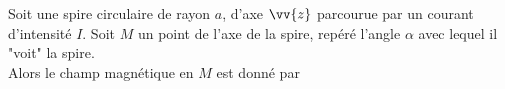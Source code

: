 ﻿\documentclass[a4paper]{article}
\begin{document}
\pagestyle{fancy}
\fancyhf{}
\setlength{\headheight}{15pt}

\begin{center}
	\large{}
\end{center}


Soit une spire circulaire de rayon \(a\), d'axe \(\vv{z}\) parcourue par un courant d'intensité \(I\). Soit \(M\) un point de l'axe de la spire, repéré l'angle \(\alpha\) avec lequel il "voit" la spire.\\
Alors le champ magnétique en \(M\) est donné par
\begin{center}
\end{center}
\end{document}
